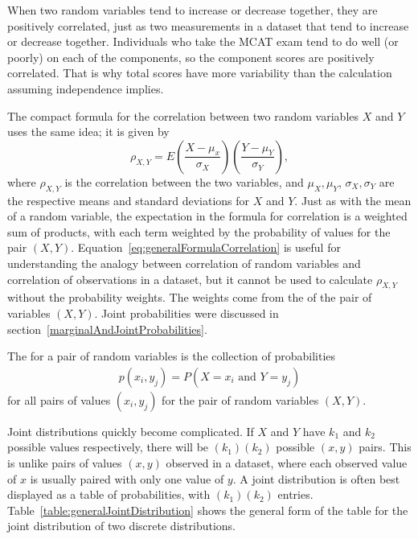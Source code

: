 When two random variables tend to increase or decrease together, they are positively correlated, just as two measurements in a dataset that tend to increase or decrease together. Individuals who take the MCAT exam tend to do well (or poorly) on each of the components, so the component scores are positively correlated.  That is why total scores have more variability than the calculation assuming independence implies.

The compact formula for the correlation between two random variables $X$ and $Y$  uses the same idea; it is given by
\begin{equation}
	\rho_{X,Y} = E\left(\frac{X - \mu_x}{\sigma_X}\right)\left(\frac{Y - \mu_Y}{\sigma_Y} \right),
	\label{eq:generalFormulaCorrelation}
\end{equation}
where $\rho_{X,Y}$ is the correlation between the two variables, and $\mu_X, \mu_Y$, $\sigma_X, \sigma_Y$ are the respective means and standard deviations for $X$ and $Y$. Just as with the mean of a random variable, the expectation in the formula for correlation is a weighted sum of products, with each term weighted by the probability of values for the pair $(X,Y)$.  Equation~\ref{eq:generalFormulaCorrelation} is useful for understanding the analogy between correlation of random variables and correlation of observations in a dataset, but it cannot be used to calculate $\rho_{X,Y}$ without the probability weights.  The weights come from the  of the pair of variables $(X,Y)$.  Joint probabilities were discussed in section~\ref{marginalAndJointProbabilities}.

\begin{termBox}{
The  for a pair of random variables is the collection of probabilities
\begin{align*}
	  p(x_i,y_j) = P(X=x_i \text{ and } Y = y_j)
\end{align*}
for all pairs of values $(x_i,y_j)$ for the pair of random variables $(X,Y)$.}
\end{termBox}

Joint distributions quickly become complicated.  If $X$ and $Y$ have $k_1$ and $k_2$ possible values respectively, there will be $(k_1)(k_2)$ possible $(x,y)$ pairs. This is unlike pairs of values $(x,y)$ observed in a dataset, where each observed value of $x$ is usually paired with only one value of $y$. A joint distribution is often best displayed as a table of probabilities, with $(k_1)(k_2)$ entries.  Table~\ref{table:generalJointDistribution} shows the general form of the table for the joint distribution of two discrete distributions.

